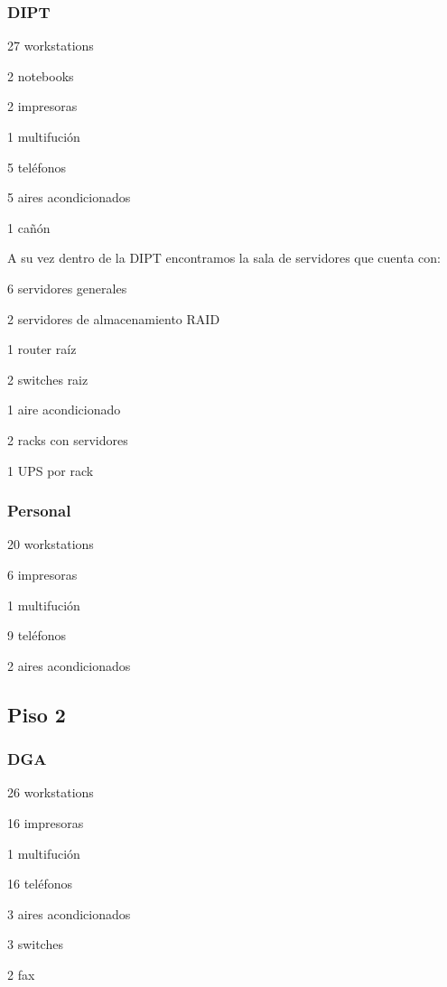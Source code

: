 \documentclass[a4paper,11pt,oneside]{article}
\begin{document}
\subsubsection*{DIPT}
%
\begin{itemize*}
\item 27 workstations
\item 2 notebooks
\item 2 impresoras
\item 1 multifución
\item 5 teléfonos
\item 5 aires acondicionados
\item 1 cañón
\end{itemize*}
%
A su vez dentro de la DIPT encontramos la sala de servidores que cuenta con:
\begin{itemize*}
\item 6 servidores generales
\item 2 servidores de almacenamiento RAID
\item 1 router raíz
\item 2 switches raiz
\item 1 aire acondicionado
\item 2 racks con servidores
\item 1 UPS por rack
\end{itemize*}
%
\subsubsection*{Personal}
\begin{itemize*}
\item 20 workstations
\item 6 impresoras
\item 1 multifución
\item 9 teléfonos
\item 2 aires acondicionados
\end{itemize*}
%
\subsection*{Piso 2}
%
\subsubsection*{DGA}
\begin{itemize*}
\item 26 workstations
\item 16 impresoras
\item 1 multifución
\item 16 teléfonos
\item 3 aires acondicionados
\item 3 switches
\item 2 fax
\end{itemize*}
%
\end{document}
